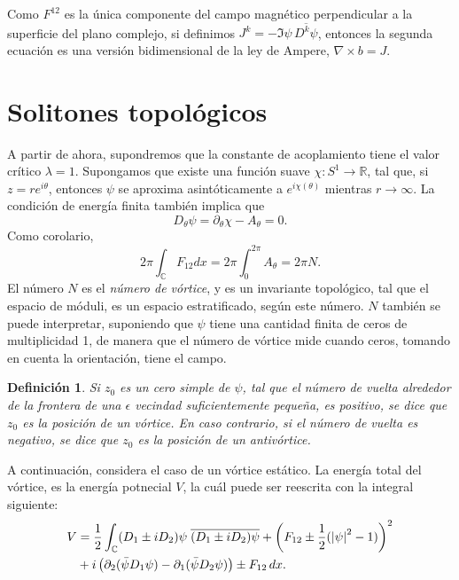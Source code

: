 \documentclass[spanish]{amsart}
\newtheorem*{definition}{Definición}
\newcommand*{\R}{\mathbb{R}}
\newcommand*{\C}{\mathbb{C}}
\newcommand*{\del}{\partial}
\begin{document}
Como \(F^{12} \) es la única componente del campo magnético
perpendicular a la superficie del plano complejo, si definimos \(J^k = -
\Im{\psi\,\overline{D^{k}\psi}}\), entonces la segunda ecuación es una
versión bidimensional de la ley de Ampere, \(\nabla\times b = J \).


\section{Solitones topológicos}
\label{sec:topological-solitons}

A partir de ahora, supondremos que la constante de acoplamiento tiene
el valor crítico \(\lambda = 1 \). Supongamos que existe una función
suave \(\chi:S^1 \to \R \), tal que, si \(z = re^{i\theta} \),
entonces \(\psi \) se aproxima asintóticamente a \(e^{i\chi(\theta)} \)
mientras \(r\to\infty \). La condición de energía finita también
implica que
\[
D_{\theta}\psi = \del_{\theta}\chi - A_{\theta} = 0.
\]
Como corolario,
\begin{equation}
\label{eq:vortex-number}
2\pi\int_{\C} F_{12}dx = 2\pi\int_0^{2\pi}A_{\theta} = 2\pi N.
\end{equation}
El número \(N \) es el \emph{número de vórtice}, y es un invariante
topológico, tal que el espacio de móduli, es un espacio estratificado,
según este número. \(N \) también se puede interpretar, suponiendo que
\(\psi \) tiene una cantidad finita de ceros de multiplicidad 1, de
manera que el número de vórtice mide cuando ceros, tomando en cuenta
la orientación, tiene el campo.

\begin{definition}
  Si \(z_0 \) es un cero simple de \(\psi \), tal que 
  el número de vuelta alrededor de la frontera de una
  \(\epsilon \) vecindad suficientemente pequeña, es positivo, se dice
  que \(z_0 \) es la posición de un vórtice. En caso contrario, si el
  número de vuelta es negativo, se dice que \(z_0 \) es la posición de
  un antivórtice.
\end{definition}

A continuación, considera el caso de un vórtice estático. La energía
total del vórtice, es la energía potnecial \(V \), la cuál puede ser
reescrita con la integral siguiente:
\begin{equation}
  \label{eq:potential-energy}
\begin{split}
  V &= \frac{1}{2} \int_{\C}(D_1 \pm iD_2)\psi\;\overline{(D_1 \pm
    iD_2)\psi} + \left( F_{12} \pm \frac{1}{2}(\abs{\psi}^2 - 1)
  \right)^2 \\
  &+ i \left( \del_2(\bar{\psi}D_1\psi) -
    \del_1(\bar{\psi}D_2\psi) \right) \pm F_{12} \,dx.
\end{split}
\end{equation}
\end{document}
